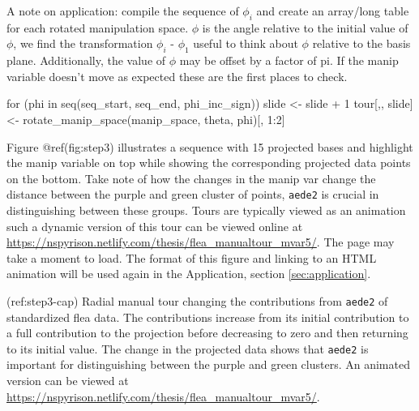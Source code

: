 A note on application: compile the sequence of \(\phi_i\) and create an array/long table for each rotated manipulation space. \(\phi\) is the angle relative to the initial value of \(\phi\), we find the transformation \(\phi_i\) - \(\phi_1\) useful to think about \(\phi\) relative to the basis plane. Additionally, the value of \(\phi\) may be offset by a factor of pi. If the manip variable doesn't move as expected these are the first places to check.

\begin{Schunk}
\begin{Sinput}
for (phi in seq(seq_start, seq_end, phi_inc_sign)) {
  slide <- slide + 1
  tour[,, slide] <- rotate_manip_space(manip_space, theta, phi)[, 1:2]
}
\end{Sinput}
\end{Schunk}

Figure @ref(fig:step3) illustrates a sequence with 15 projected bases and highlight the manip variable on top while showing the corresponding projected data points on the bottom. Take note of how the changes in the manip var change the distance between the purple and green cluster of points, \texttt{aede2} is crucial in distinguishing between these groups. Tours are typically viewed as an animation such a dynamic version of this tour can be viewed online at \url{https://nspyrison.netlify.com/thesis/flea_manualtour_mvar5/}. The page may take a moment to load. The format of this figure and linking to an HTML animation will be used again in the Application, section \ref{sec:application}.

(ref:step3-cap) Radial manual tour changing the contributions from \texttt{aede2} of standardized flea data. The contributions increase from its initial contribution to a full contribution to the projection before decreasing to zero and then returning to its initial value. The change in the projected data shows that \texttt{aede2} is important for distinguishing between the purple and green clusters. An animated version can be viewed at \url{https://nspyrison.netlify.com/thesis/flea_manualtour_mvar5/}.

